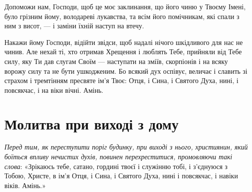 \documentclass[chapters.tex]{subfiles}
\begin{document}
Допоможи нам, Господи, щоб це моє заклинання, що його чиню у Твоєму Імені, було грізним йому, володареві лукавства, та всім його помічникам, які спали з ним з висот, — і заміни їхній наступ на втечу.

Накажи йому Господи, відійти звідси, щоб надалі нічого шкідливого для нас не чинив. Але нехай ті, хто отримав Хрещення і люблять Тебе, прийняли від Тебе силу, яку Ти дав слугам Своїм — наступати на зміїв, скорпіонів і на всяку ворожу силу та не бути ушкодженим. Бо всякий дух оспівує, величає і славить зі страхом і тремтінням пресвяте ім’я Твоє: Отця, і Сина, і Святого Духа, нині, і повсякчас, і на віки вічні. Амінь.

\section{Молитва при виході з дому}
\emph{Перед тим, як переступити поріг будинку, при виході з нього, християнин, який боїться впливу нечистих духів, повинен перехреститися, промовляючи такі слова}: «Зрікаюсь тебе, сатано, гордині твоєї і служінню тобі, і з’єднуюся з Тобою, Христе, в ім’я Отця, і Сина, і Святого Духа, нині і повсякчас, і навіки віків. Амінь.»
\end{document}
